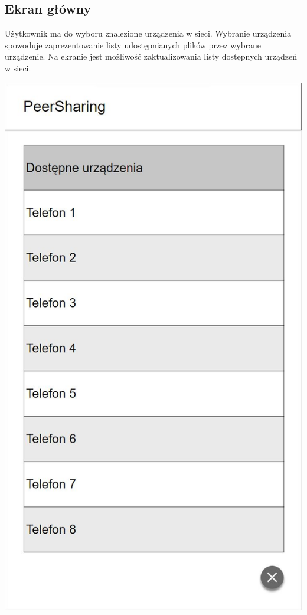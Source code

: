 \documentclass[12pt,a4paper]{article}
\begin{document}
\subsection{Ekran główny}
Użytkownik ma do wyboru znalezione urządzenia w sieci. Wybranie urządzenia spowoduje zaprezentowanie listy udostępnianych plików przez wybrane urządzenie. Na ekranie jest możliwość zaktualizowania listy dostępnych urządzeń w sieci.
\begin{center}
\includegraphics[scale=0.6]{1.JPG}
\end{center}
\end{document}
